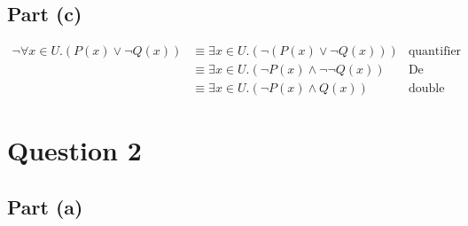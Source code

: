 \documentclass[11pt, a4paper]{article}
\begin{document}
\subsection*{Part (c)}
\begin{align*}
	\neg \forall x \in U.(P(x) \lor \neg Q(x)) &\equiv \exists x \in U.(\neg (P(x) \lor \neg Q(x)))     & \text{quantifier law} \\
	                                           &\equiv \exists x \in U.(\neg P(x) \land \neg \neg Q(x)) & \text{De Morgan's law} \\
						   &\equiv \exists x \in U.(\neg P(x) \land Q(x))           & \text{double negation law}
\end{align*}

\section*{Question 2}
\subsection*{Part (a)}
\begin{align*}
	
\end{align*}
\end{document}
